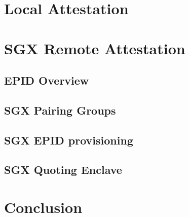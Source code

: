 \documentclass[10pt]{article}
\begin{document}
  \section{Local Attestation}
  \label{sec:localatt}

  \section{SGX Remote Attestation}
  \label{sec:remoteatt}

  \subsection{EPID Overview}
  \label{ssec:epid}

  \subsection{SGX Pairing Groups}
  \label{ssec:pairings}

  \subsection{SGX EPID provisioning}
  \label{ssec:epidprov}

  \subsection{SGX Quoting Enclave}
  \label{ssec:qe}

  \section{Conclusion}
  \label{sec:conclusion}



\end{document}
